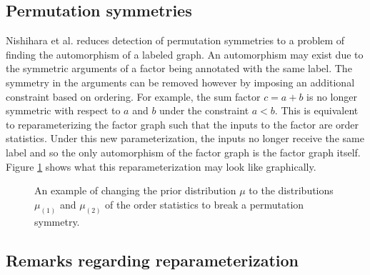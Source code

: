 \subsection{Permutation symmetries}

Nishihara et al. reduces detection of permutation symmetries to a problem of finding the automorphism of a labeled graph. An automorphism may exist due to the symmetric arguments of a factor being annotated with the same label. The symmetry in the arguments can be removed however by imposing an additional constraint based on ordering. For example, the sum factor $c=a+b$ is no longer symmetric with respect to $a$ and $b$ under the constraint $a<b$. This is equivalent to reparameterizing the factor graph such that the inputs to the factor are order statistics. Under this new parameterization, the inputs no longer receive the same label and so the only automorphism of the factor graph is the factor graph itself. Figure \ref{fig:changeprior} shows what this reparameterization may look like graphically.

\begin{figure}[h]
\begin{center}
\hspace*{2cm}
\end{center}
\caption{An example of changing the prior distribution $\mu$ to the distributions $\mu_{(1)}$ and $\mu_{(2)}$ of the order statistics to break a permutation symmetry.}
\label{fig:changeprior}
\end{figure}


\subsection{Remarks regarding reparameterization}

